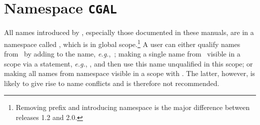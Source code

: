 \section{Namespace \texttt{CGAL}}
All names introduced by \cgal, especially those documented in these manuals,
are in a namespace called , which is in global 
scope.\footnote{Removing prefix  and introducing namespace 
 is the major difference between releases 1.2 and 2.0.} 
A user can either qualify names from \cgal\ by adding  to the name,
\textit{e.g.},\ ; making a 
single name from \cgal\ visible in a scope via a  statement, 
\textit{e.g.}, , and then use this name 
unqualified in this scope; or making all names from namespace  
visible in a scope with . The latter, however, is 
likely to give rise to name conflicts and is therefore not recommended.   
